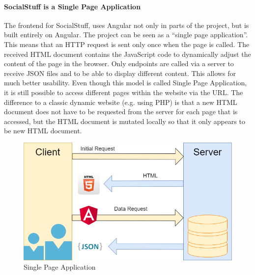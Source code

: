 \paragraph{SocialStuff is a Single Page Application}
The frontend for SocialStuff, uses Angular not only in parts of the project, but is built entirely on Angular.  The project can be seen as a \enquote{single page application}. This means that an HTTP request is sent only once when the page is called. The received HTML document contains the JavaScript code to dynamically adjust the content of the page in the browser. Only endpoints are called via a server to receive JSON files and to be able to display different content.  This allows for much better usability. Even though this model is called Single Page Application, it is still possible to access different pages within the website via the URL. The difference to a classic dynamic website (e.g. using PHP) is that a new HTML document does not have to be requested from the server for each page that is accessed, but the HTML document is mutated locally so that it only appears to be new HTML document.
\begin{figure}[h]
	\centering
	\includegraphics[width=1.0\textwidth]{./images/single_page_app}
	\caption{Single Page Application}
	\label{fig:singpageapp}
\end{figure}
\newpage
